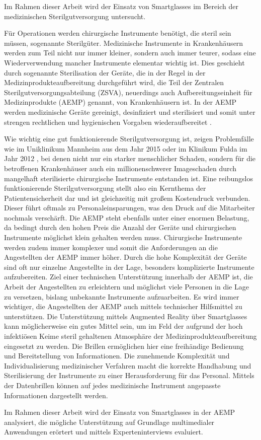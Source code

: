 Im Rahmen dieser Arbeit wird der Einsatz von Smartglasses im Bereich der medizinischen Sterilgutversorgung untersucht. 

Für Operationen werden chirurgische Instrumente benötigt, die steril sein müssen, sogenannte Sterilgüter.
Medizinische Instrumente in Krankenhäusern werden zum Teil nicht nur immer kleiner, sondern auch immer teurer, sodass eine Wiederverwendung mancher Instrumente elementar wichtig ist. Dies geschieht durch sogenannte Sterilisation der Geräte, die in der Regel in der Medizinprodukteaufbereitung durchgeführt wird, die Teil der Zentralen Sterilgutversorgungsabteilung (ZSVA), neuerdings auch Aufbereitungseinheit für Medizinprodukte (AEMP) genannt, von Krankenhäusern ist. In der AEMP werden medizinische Geräte gereinigt, desinfiziert und sterilisiert und somit unter strengen rechtlichen und hygienischen Vorgaben wiederaufbereitet \cite{AKI-ArbeitskreisInstrumenten-Aufbereitung2012}.

Wie wichtig eine gut funktionierende Sterilgutversorgung ist, zeigen Problemfälle wie im Uniklinikum Mannheim \cite{Brandt2015} aus dem Jahr 2015 oder im Klinikum Fulda im Jahr 2012 \cite{HygieneFuldar2012}, bei denen nicht nur ein starker menschlicher Schaden, sondern für die betroffenen Krankenhäuser auch ein millionenschwerer Imageschaden durch mangelhaft sterilisierte chirurgische Instrumente entstanden ist. Eine reibungslos funktionierende Sterilgutversorgung stellt also ein Kernthema der Patientensicherheit dar und ist gleichzeitig mit großem Kostendruck verbunden. Dieser führt oftmals zu Personaleinsparungen, was den Druck auf die Mitarbeiter nochmals verschärft. Die AEMP steht ebenfalls unter einer enormen Belastung, da bedingt durch den hohen Preis die Anzahl der Geräte und chirurgischen Instrumente möglichst klein gehalten werden muss. Chirurgische Instrumente werden zudem immer komplexer und somit die Anforderungen an die Angestellten der AEMP immer höher. Durch die hohe Komplexität der Geräte sind oft nur einzelne Angestellte in der Lage, besonders komplizierte Instrumente aufzubereiten. Ziel einer technischen Unterstützung innerhalb der AEMP ist, die Arbeit der Angestellten zu erleichtern und möglichst viele Personen in die Lage zu versetzen, bislang unbekannte Instrumente aufzuarbeiten. Es wird immer wichtiger, die Angestellten der AEMP auch mittels technischer Hilfsmittel zu unterstützen. Die Unterstützung mittels Augmented Reality über Smartglasses kann möglicherweise ein gutes Mittel sein, um im Feld der aufgrund der hoch infektiösen Keime steril gehaltenen Atmosphäre der Medizinprodukteaufbereitung eingesetzt zu werden. Die Brillen ermöglichen hier eine freihändige Bedienung und Bereitstellung von Informationen. Die zunehmende Komplexität und Individualisierung medizinischer Verfahren macht die korrekte Handhabung und Sterilisierung der Instrumente zu einer Herausforderung für das Personal. Mittels der Datenbrillen können auf jedes medizinische Instrument angepasste Informationen dargestellt werden. 

Im Rahmen dieser Arbeit wird der Einsatz von Smartglasses in der AEMP analysiert, die mögliche Unterstützung auf Grundlage multimedialer Anwendungen erörtert und mittels Experteninterviews evaluiert. 